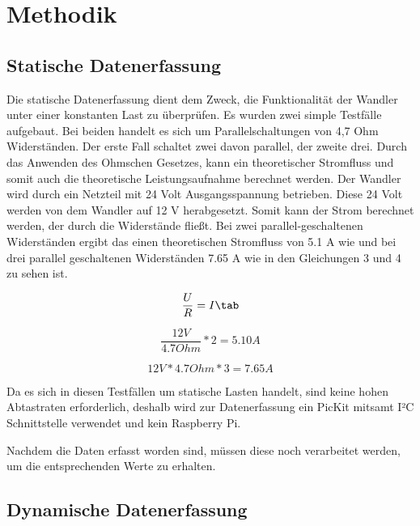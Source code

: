 \section{Methodik}
\subsection{Statische Datenerfassung}

Die statische Datenerfassung dient dem Zweck, die Funktionalität der Wandler unter einer konstanten Last zu überprüfen. Es wurden zwei simple Testfälle aufgebaut. Bei beiden handelt es sich um Parallelschaltungen von 4,7 Ohm Widerständen. Der erste Fall schaltet zwei davon parallel, der zweite drei. Durch das Anwenden des Ohmschen Gesetzes, kann ein theoretischer Stromfluss und somit auch die theoretische Leistungsaufnahme berechnet werden. Der Wandler wird durch ein Netzteil mit 24 Volt Ausgangsspannung betrieben. Diese 24 Volt werden von dem Wandler auf 12 V herabgesetzt. Somit kann der Strom berechnet werden, der durch die Widerstände fließt. Bei zwei parallel-geschaltenen Widerständen ergibt das einen theoretischen Stromfluss von 5.1 A wie und bei drei parallel geschaltenen Widerständen 7.65 A wie in den Gleichungen 3 und 4 zu sehen ist.

\begin{equation}
\label{Ohmsches Gesetz}
\frac{U}{R} = I \tab
\end{equation}


\begin{equation}
\label{Ohmsches Gesetz}
\frac{12V}{4.7 Ohm}*2 = 5.10 A 
\end{equation}


\begin{equation}
\label{Ohmsches Gesetz}
12V*4.7 Ohm*3 = 7.65 A 
\end{equation}


Da es sich in diesen Testfällen um statische Lasten handelt, sind keine hohen Abtastraten erforderlich, deshalb wird zur Datenerfassung ein PicKit mitsamt I²C Schnittstelle verwendet und kein Raspberry Pi. 

Nachdem die Daten erfasst worden sind, müssen diese noch verarbeitet werden, um die entsprechenden Werte zu erhalten.
 

\subsection{Dynamische Datenerfassung}

